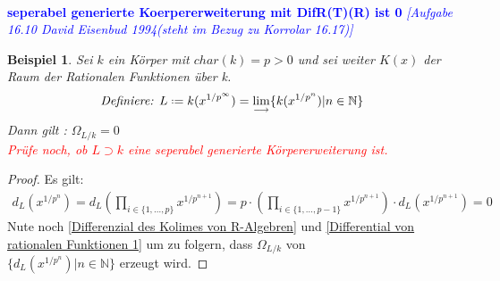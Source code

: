 \documentclass[10pt,a4paper]{report}
\newcommand{\comment}[1]{}
\newcommand{\ModulsOfDifferenzials}{David Eisenbud 1994}
\newcounter{Aussage}[chapter]
\newtheorem{bsp}[Aussage]{Beispiel}
\newcommand{\divR}[2]{\Omega_{#1/#2}}
\newcommand{\divf}[1]{d_{#1}}
\newcommand{\colimes}[0]{\lim\limits_{ \longrightarrow }}
\newcommand*{\defeq}{\mathrel{\vcenter{\baselineskip0.5ex \lineskiplimit0pt
                     \hbox{\scriptsize.}\hbox{\scriptsize.}}}%
                     =}
\begin{document}
\ \\
\textcolor{blue}{\textbf{seperabel generierte Koerpererweiterung mit DifR(T)(R) ist 0} \textit{[Aufgabe 16.10 \ModulsOfDifferenzials (steht im Bezug zu Korrolar 16.17)]}}
\begin{bsp}\comment{\label{unendliche, seperabel generierte Koerpererweiterung mit DifR(T)(R) ist 0}}
Sei $k$ ein Körper mit $char(k) = p > 0$ und sei weiter $K(x)$ der Raum der Rationalen Funktionen über k.
\begin{gather*}
\textit{Definiere: } L \defeq k(x^{1/{p^{\infty}}}) = \colimes \lbrace k(x^{1/{p^{n}}}) \vert n \in \mathbb{N} \rbrace
\end{gather*}
Dann gilt : $\divR{L}{k} = 0$\\
\textcolor{red}{Prüfe noch, ob $L \supset k$ eine seperabel generierte Körpererweiterung \comment{\label{*Def seperabel generierte Körpererweiterung}} ist.}
\end{bsp}
\begin{proof}\comment{Skizzenhaft}
Es gilt:
\begin{gather*}
\divf{L}(x^{1/{p^{n}}})
= \divf{L} \left( \prod_{i \in \lbrace 1,\dots,p \rbrace} x^{1/{p^{n+1}}}\right)
=  p \cdot \left( \prod_{i \in \lbrace 1,\dots,p-1 \rbrace} x^{1/{p^{n+1}}} \right) \cdot \divf{L}(x^{1/{p^{n+1}}})
= 0
\end{gather*}
Nute noch \cref{Differenzial des Kolimes von R-Algebren} und \cref{Differential von rationalen Funktionen 1} um zu folgern, dass $\divR{L}{k}$ von \\
$\lbrace \divf{L}(x^{1/{p^{n}}}) \vert n \in \mathbb{N} \rbrace$ erzeugt wird.
\end{proof}
\end{document}

